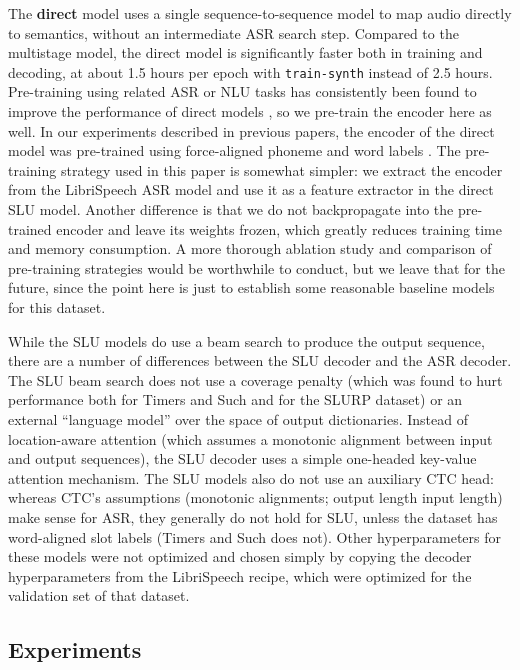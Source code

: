 \documentclass{article}
\begin{document}
The \textbf{direct} model uses a single sequence-to-sequence model to map audio directly to semantics, without an intermediate ASR search step. 
Compared to the multistage model, the direct model is significantly faster both in training and decoding, at about 1.5 hours per epoch with \texttt{train-synth} instead of 2.5 hours. 
Pre-training using related ASR or NLU tasks has consistently been found to improve the performance of direct models \cite{lugosch2019speech, wang2020large, huang2020leveraging, sharma2021leveraging, chung2021splat}, so we pre-train the encoder here as well. 
In our experiments described in previous papers, the encoder of the direct model was pre-trained using force-aligned phoneme and word labels \cite{lugosch2019speech, lugosch2020using}. The pre-training strategy used in this paper is somewhat simpler: we extract the encoder from the LibriSpeech ASR model and use it as a feature extractor in the direct SLU model. 
Another difference is that we do not backpropagate into the pre-trained encoder and leave its weights frozen, which greatly reduces training time and memory consumption. A more thorough ablation study and comparison of pre-training strategies would be worthwhile to conduct, but we leave that for the future, since the point here is just to establish some reasonable baseline models for this dataset.

While the SLU models do use a beam search to produce the output sequence, there are a number of differences between the SLU decoder and the ASR decoder. The SLU beam search does not use a coverage penalty (which was found to hurt performance both for Timers and Such and for the SLURP dataset) or an external ``language model'' over the space of output dictionaries. Instead of location-aware attention (which assumes a monotonic alignment between input and output sequences), the SLU decoder uses a simple one-headed key-value attention mechanism. The SLU models also do not use an auxiliary CTC head: whereas CTC's assumptions (monotonic alignments; output length  input length) make sense for ASR, they generally do not hold for SLU, unless the dataset has word-aligned slot labels (Timers and Such does not). Other hyperparameters for these models were not optimized and chosen simply by copying the decoder hyperparameters from the LibriSpeech recipe, which were optimized for the validation set of that dataset.

\subsection{Experiments}\label{experiments}
\end{document}
